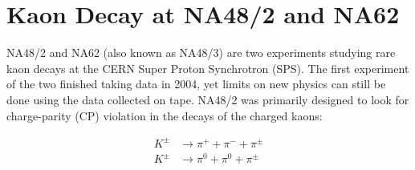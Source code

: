 \section{Kaon Decay at NA48/2 and NA62}
NA48/2 and NA62 (also known as NA48/3) are two experiments studying rare kaon decays at the CERN Super Proton Synchrotron (SPS).
The first experiment of the two finished taking data in 2004, yet limits on new physics can still be done using the data collected on tape.
NA48/2 was primarily designed to look for charge-parity (CP) violation in the decays of the charged kaons:

\begin{align}
K^\pm & \rightarrow \pi^+ + \pi^- + \pi^\pm \\
K^\pm & \rightarrow \pi^0 + \pi^0 + \pi^\pm
\end{align}
